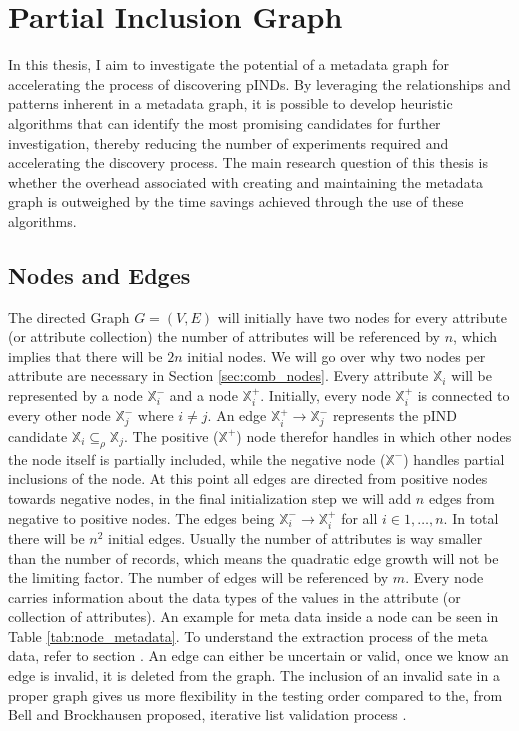 
\chapter{Partial Inclusion Graph}
In this thesis, I aim to investigate the potential of a metadata graph for accelerating the process of discovering pINDs. By leveraging the relationships and patterns inherent in a metadata graph, it is possible to develop heuristic algorithms that can identify the most promising candidates for further investigation, thereby reducing the number of experiments required and accelerating the discovery process. The main research question of this thesis is whether the overhead associated with creating and maintaining the metadata graph is outweighed by the time savings achieved through the use of these algorithms.

\section{Nodes and Edges}
The directed Graph $G = (V, E)$ will initially have two nodes for every attribute (or attribute collection) the number of attributes will be referenced by $n$, which implies that there will be $2n$ initial nodes. We will go over why two nodes per attribute are necessary in Section \ref{sec:comb_nodes}. Every attribute $\mathbb{X}_i$ will be represented by a node $\mathbb{X}_i^-$ and a node $\mathbb{X}_i^+$. Initially, every node $\mathbb{X}_i^+$ is connected to every other node $\mathbb{X}_j^-$ where $i \not = j$. An edge $\mathbb{X}_i^+ \rightarrow \mathbb{X}_j^-$ represents the pIND candidate $\mathbb{X}_i \subseteq_\rho \mathbb{X}_j$. The positive ($\mathbb{X}^+$) node therefor handles in which other nodes the node itself is partially included, while the negative node ($\mathbb{X}^-$) handles partial inclusions of the node. At this point all edges are directed from positive nodes towards negative nodes, in the final initialization step we will add $n$ edges from negative to positive nodes. The edges being $\mathbb{X}_i^- \rightarrow \mathbb{X}_i^+$ for all $i \in 1, \dots, n$. In total there will be $n^2$ initial edges. Usually the number of attributes is way smaller than the number of records, which means the quadratic edge growth will not be the limiting factor. The number of edges will be referenced by $m$. Every node carries information about the data types of the values in the attribute (or collection of attributes). An example for meta data inside a node can be seen in Table \ref{tab:node_metadata}. To understand the extraction process of the meta data, refer to section %
. An edge can either be uncertain or valid, once we know an edge is invalid, it is deleted from the graph. The inclusion of an invalid sate in a proper graph gives us more flexibility in the testing order compared to the, from Bell and Brockhausen proposed, iterative list validation process \cite{bell1995discovery}.

